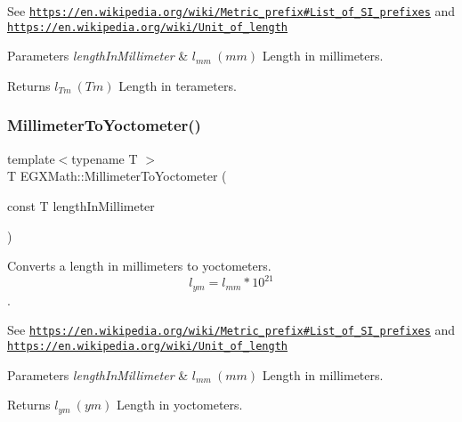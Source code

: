 See \href{https://en.wikipedia.org/wiki/Metric_prefix#List_of_SI_prefixes}{\tt https\+://en.\+wikipedia.\+org/wiki/\+Metric\+\_\+prefix\#\+List\+\_\+of\+\_\+\+S\+I\+\_\+prefixes} and \href{https://en.wikipedia.org/wiki/Unit_of_length}{\tt https\+://en.\+wikipedia.\+org/wiki/\+Unit\+\_\+of\+\_\+length} 
\begin{DoxyParams}{Parameters}
{\em length\+In\+Millimeter} & $ l_{mm}\ (mm)$ Length in millimeters. \\
\hline
\end{DoxyParams}
\begin{DoxyReturn}{Returns}
$ l_{Tm}\ (Tm)$ Length in terameters. 
\end{DoxyReturn}
\mbox{\label{group___e_g_x_math-_conversions-_length_conversions-_millimeter-_s_i_ga7f8020bb633d6ed2cd874a8c66d2893d}} 
\subsubsection{\texorpdfstring{Millimeter\+To\+Yoctometer()}{MillimeterToYoctometer()}}
{\footnotesize\ttfamily template$<$typename T $>$ \\
T E\+G\+X\+Math\+::\+Millimeter\+To\+Yoctometer (\begin{DoxyParamCaption}\item[{const T}]{length\+In\+Millimeter }\end{DoxyParamCaption})}



Converts a length in millimeters to yoctometers. \[ l_{ym}=l_{mm} * 10^{21} \]. 

See \href{https://en.wikipedia.org/wiki/Metric_prefix#List_of_SI_prefixes}{\tt https\+://en.\+wikipedia.\+org/wiki/\+Metric\+\_\+prefix\#\+List\+\_\+of\+\_\+\+S\+I\+\_\+prefixes} and \href{https://en.wikipedia.org/wiki/Unit_of_length}{\tt https\+://en.\+wikipedia.\+org/wiki/\+Unit\+\_\+of\+\_\+length} 
\begin{DoxyParams}{Parameters}
{\em length\+In\+Millimeter} & $ l_{mm}\ (mm)$ Length in millimeters. \\
\hline
\end{DoxyParams}
\begin{DoxyReturn}{Returns}
$ l_{ym}\ (ym)$ Length in yoctometers. 
\end{DoxyReturn}
\mbox{\label{group___e_g_x_math-_conversions-_length_conversions-_millimeter-_s_i_ga0c63bb9317c6f47942e00d23d0bf9762}} 
